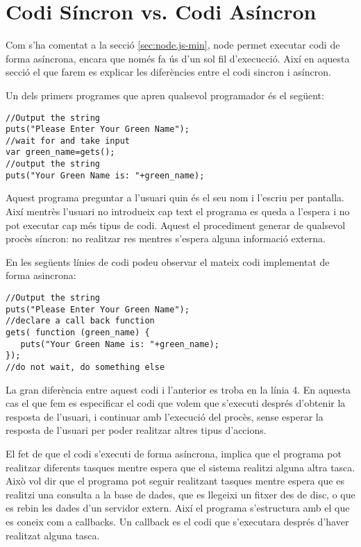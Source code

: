 \section{Codi Síncron vs. Codi Asíncron}

Com s'ha comentat a la secció \ref{sec:node.js-min}, node permet executar codi de forma asíncrona, encara que només fa ús d'un sol fil d'execucció. Així en aquesta secció el que farem es explicar les diferències entre el codi sincron i asíncron.

Un dels primers programes que apren qualsevol programador és el següent:

\begin{lstlisting}
//Output the string
puts("Please Enter Your Green Name");
//wait for and take input
var green_name=gets();
//output the string
puts("Your Green Name is: "+green_name);
\end{lstlisting}

Aquest programa preguntar a l'usuari quin és el seu nom i l'escriu per pantalla. Així mentrès l'usuari no introdueix cap text el programa es queda a l'espera i no pot executar cap més tipus de codi. Aquest el procediment generar de qualsevol procès síncron: no realitzar res mentres s'espera alguna informació externa.

En les següents línies de codi podeu observar el mateix codi implementat de forma asincrona:
	
\begin{lstlisting}
//Output the string
puts("Please Enter Your Green Name");
//declare a call back function
gets( function (green_name) {
   puts("Your Green Name is: "+green_name);
});
//do not wait, do something else
\end{lstlisting}

La gran diferència entre aquest codi i l'anterior es troba en la línia 4. En aquesta cas el que fem es especificar el codi que volem que s'executi després d'obtenir la resposta de l'usuari, i continuar amb l'execució del procès, sense esperar la resposta de l'usuari per poder realitzar altres tipus d'accions. 

El fet de que el codi s'executi de forma asíncrona, implica que el programa pot realitzar diferents tasques mentre espera que el sistema realitzi alguna altra tasca. Això vol dir que el programa pot seguir realitzant tasques mentre espera que es realitzi una consulta a la base de dades, que es llegeixi un fitxer des de disc, o que es rebin les dades d'un servidor extern. Així el programa s'estructura amb el que es coneix com a callbacks. Un callback es el codi que s'executara després d'haver realitzat alguna tasca. 

